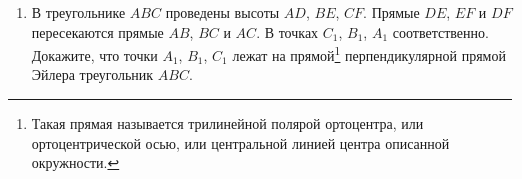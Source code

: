 \begin{enumerate}
{            Также по \cref{th:chev,th:menel}

            \begin{equation}\label{eq:42.3}
                \frac{BT}{CT} \underset{\text{по \cref{th:menel}}}{=} \frac{BF}{FA}\cdot \frac{AE}{EC} \underset{\text{по \cref{th:chev}}}{=} \frac{BD}{DC}.
            \end{equation}

            Заметим что в уравнениях  остались только точки на прямой $BC$. Такую задачу можно решить координатным способом, за начало координат приняв $T$. 
            \begin{equation}\label{eq:42.4}
                \begin{aligned}
                    \frac{TB}{TC} &= \frac{BD}{DC} = \frac{TD-TB}{TC-TD} \Longleftrightarrow \\ 
                    \Longleftrightarrow TB(TC-TD) &= TC(TD-TB) \\
                    TB\cdot TC - TB \cdot TD &= TC \cdot TD - TB\cdot TC \\
                    2 TB\cdot TC &= TD \left( TC + TB \right) \\
                    TB \cdot TC &= TD \cdot \frac{TC+TB}{2} = TD \cdot TM. \\
                \end{aligned} 
            \end{equation} 

            Хочется еще отметить, что из уравнения  следует, что 
            \[
                TD = \frac{2TB\cdot TC}{TB + TC} = \frac{2}{\frac{1}{TB}+\frac{1}{TC}}
            .\] 
            
            Поэтому четверка точек  $\left( T, B, D, C \right) $ называется \emph{гармонической}.
        }

    \item В треугольнике $ABC$ проведены высоты $AD$, $BE$, $CF$. Прямые $DE$, $EF$ и $DF$ пересекаются прямые $AB$, $BC$ и $AC$. В точках $C_1$, $B_1$, $A_1$ соответственно. Докажите, что точки $A_1$, $B_1$, $C_1$ лежат на прямой\footnote{Такая прямая называется трилинейной полярой ортоцентра, или ортоцентрической осью, или центральной линией центра описанной окружности.} перпендикулярной прямой Эйлера треугольник $ABC$.


\end{enumerate}
